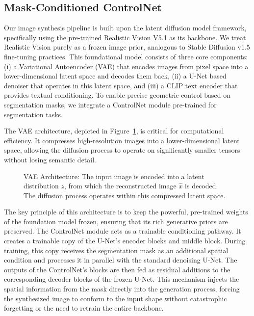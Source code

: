 \documentclass[a4paper,11pt]{article}
\begin{document}
\subsection{Mask-Conditioned ControlNet}

Our image synthesis pipeline is built upon the latent diffusion model framework, specifically using the pre-trained Realistic Vision V5.1 as its backbone. We treat Realistic Vision purely as a frozen image prior, analogous to Stable Diffusion v1.5 fine-tuning practices. This foundational model consists of three core components: (i) a Variational Autoencoder (VAE) that encodes images from pixel space into a lower-dimensional latent space and decodes them back, (ii) a U-Net based denoiser that operates in this latent space, and (iii) a CLIP text encoder that provides textual conditioning. To enable precise geometric control based on segmentation masks, we integrate a ControlNet module pre-trained for segmentation tasks.

The VAE architecture, depicted in Figure~\ref{fig:vae}, is critical for computational efficiency. It compresses high-resolution images into a lower-dimensional latent space, allowing the diffusion process to operate on significantly smaller tensors without losing semantic detail.

\begin{figure}[H]
    \centering
    \resizebox{\linewidth}{!}{}
    \caption{VAE Architecture: The input image is encoded into a latent distribution $z$, from which the reconstructed image $\hat{x}$ is decoded. The diffusion process operates within this compressed latent space.}
    \label{fig:vae}
\end{figure}

The key principle of this architecture is to keep the powerful, pre-trained weights of the foundation model frozen, ensuring that its rich generative priors are preserved. The ControlNet module acts as a trainable conditioning pathway. It creates a trainable copy of the U-Net's encoder blocks and middle block. During training, this copy receives the segmentation mask as an additional spatial condition and processes it in parallel with the standard denoising U-Net. The outputs of the ControlNet's blocks are then fed as residual additions to the corresponding decoder blocks of the frozen U-Net. This mechanism injects the spatial information from the mask directly into the generation process, forcing the synthesized image to conform to the input shape without catastrophic forgetting or the need to retrain the entire backbone.
\end{document}

